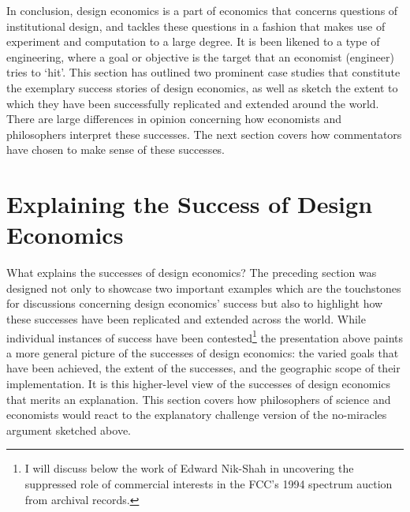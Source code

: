 In conclusion, design economics is a part of economics that concerns questions of institutional design, and tackles these questions in a fashion that makes use of experiment and computation to a large degree. It is been likened to a type of engineering, where 
a goal or objective is the target that an economist (engineer) tries to `hit'. This section has outlined two prominent case studies that constitute the exemplary success stories of design economics, as well as sketch the extent to which they have been successfully replicated and extended around the world. There are large differences in opinion concerning how economists and philosophers interpret these successes. The next section covers how commentators have chosen to make sense of these successes.





\section{Explaining the Success of Design Economics}\label{fable_sec_success}

What explains the successes of design economics? The preceding section was designed not only to showcase two important examples which are the touchstones for discussions concerning design economics' success but also to highlight how these successes have been replicated and extended across the world. While individual instances of success have been contested\footnote{I will discuss below the work of Edward Nik-Shah \autocite*{nikkhah2008} in uncovering the suppressed role of commercial interests in the FCC's 1994 spectrum auction from archival records.} the presentation above paints a more general picture of the successes of design economics: the varied goals that have been achieved, the extent of the successes, and the geographic scope of their implementation. It is this higher-level view of the successes of design economics that merits an explanation. This section covers how philosophers of science and economists would react to the explanatory challenge version of the no-miracles argument sketched above. 

